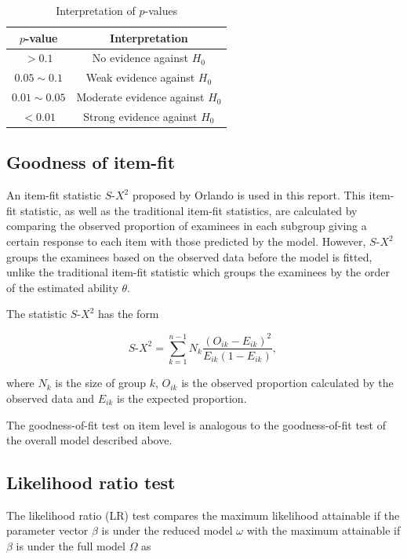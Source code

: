 \documentclass[a4paper]{report}
\begin{document}
\begin{table}[ht]
  \centering
  \begin{tabular}{cc}
    \hline
    $p$-value & Interpretation \\
    \hline
    $>0.1$ & No evidence against $H_0$ \\
    $0.05 \sim 0.1$ & Weak evidence against $H_0$ \\
    $0.01 \sim 0.05$ & Moderate evidence against $H_0$ \\
    $<0.01$ & Strong evidence against $H_0$ \\
    \hline
  \end{tabular}
  \caption{\label{tab:pvalue}Interpretation of $p$-values}
\end{table}

\subsection{Goodness of item-fit}

An item-fit statistic $S\text{-}X^2$ proposed by Orlando \cite{disx2} is used in this report. This item-fit statistic, as well as the traditional item-fit statistics, are calculated by comparing the observed proportion of examinees in each subgroup giving a certain response to each item with those predicted by the model. However, $S\text{-}X^2$ groups the examinees based on the observed data before the model is fitted, unlike the traditional item-fit statistic which groups the examinees by the order of the estimated ability $\theta$. 

The statistic $S\text{-}X^2$ has the form

$$S\text{-}X^2 = \sum_{k=1}^{n-1} N_k \frac{(O_{ik} - E_{ik})^2}{E_{ik} (1-E_{ik})} \text{, }$$

\noindent
where $N_k$ is the size of group $k$, $O_{ik}$ is the observed proportion calculated by the observed data and $E_{ik}$ is the expected proportion. 

The goodness-of-fit test on item level is analogous to the goodness-of-fit test of the overall model described above. 

\subsection{Likelihood ratio test}

The likelihood ratio (LR) test compares the maximum likelihood attainable if the parameter vector $\beta$ is under the reduced model $\omega$ with the maximum attainable if $\beta$ is under the full model $\Omega$ as 
\end{document}
